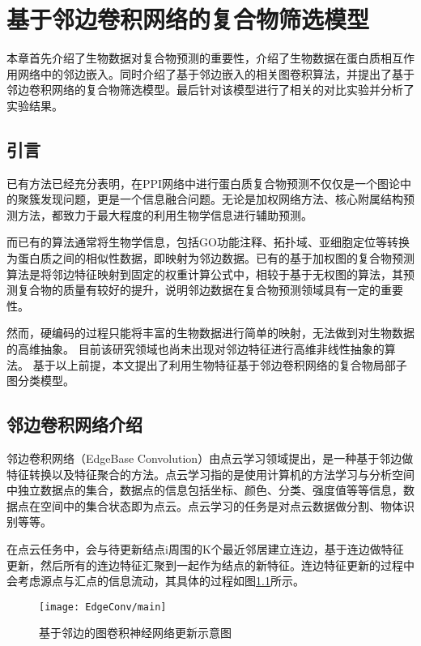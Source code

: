 \chapter{基于邻边卷积网络的复合物筛选模型}
\label{chapter:EdgeConv}

本章首先介绍了生物数据对复合物预测的重要性，介绍了生物数据在蛋白质相互作用网络中的邻边嵌入。同时介绍了基于邻边嵌入的相关图卷积算法，并提出了基于邻边卷积网络的复合物筛选模型。最后针对该模型进行了相关的对比实验并分析了实验结果。

\section{引言}
\label{section:EdgeConv:Put}

已有方法已经充分表明，在PPI网络中进行蛋白质复合物预测不仅仅是一个图论中的聚簇发现问题，更是一个信息融合问题。无论是加权网络方法、核心附属结构预测方法，都致力于最大程度的利用生物学信息进行辅助预测。

而已有的算法通常将生物学信息，包括GO功能注释、拓扑域、亚细胞定位等转换为蛋白质之间的相似性数据，即映射为邻边数据。已有的基于加权图的复合物预测算法是将邻边特征映射到固定的权重计算公式中，相较于基于无权图的算法，其预测复合物的质量有较好的提升，说明邻边数据在复合物预测领域具有一定的重要性。

然而，硬编码的过程只能将丰富的生物数据进行简单的映射，无法做到对生物数据的高维抽象。
目前该研究领域也尚未出现对邻边特征进行高维非线性抽象的算法。
基于以上前提，本文提出了利用生物特征基于邻边卷积网络的复合物局部子图分类模型。

\section{邻边卷积网络介绍}
\label{section:EdgeConv:intro}

邻边卷积网络\cite{wang_dynamic_2019}（EdgeBase Convolution）由点云学习领域提出，是一种基于邻边做特征转换以及特征聚合的方法。点云学习指的是使用计算机的方法学习与分析空间中独立数据点的集合，数据点的信息包括坐标、颜色、分类、强度值等等信息，数据点在空间中的集合状态即为点云。点云学习的任务是对点云数据做分割、物体识别等等。

在点云任务中，会与待更新结点i周围的K个最近邻居建立连边，基于连边做特征更新，然后所有的连边特征汇聚到一起作为结点的新特征。连边特征更新的过程中会考虑源点与汇点的信息流动，其具体的过程如图\ref{fig:EdgeConv/main}所示。
\begin{figure}[htbp]
    \centering
    \texttt{[image: EdgeConv/main]}
    \caption{基于邻边的图卷积神经网络更新示意图\cite{wang_dynamic_2019}}
    \label{fig:EdgeConv/main}
\end{figure}

